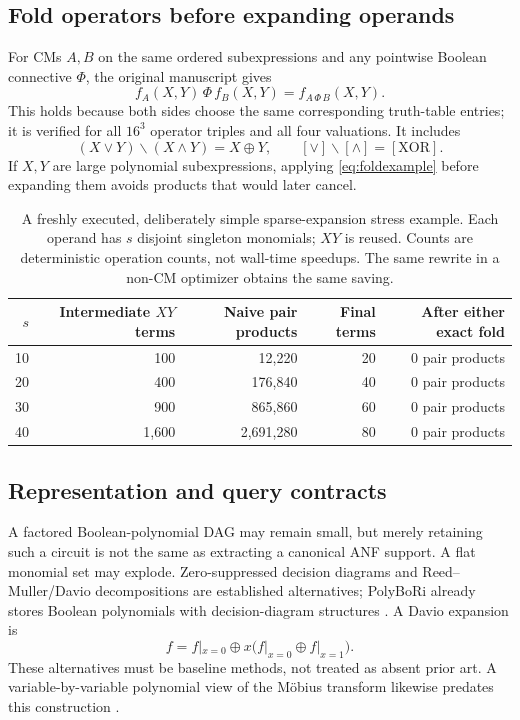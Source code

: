 \documentclass[11pt,a4paper]{article}
\theoremstyle{definition}\newtheorem{definition}[theorem]{Definition}
\theoremstyle{remark}\newtheorem{remark}[theorem]{Remark}
\numberwithin{equation}{section}
\begin{document}
\subsection{Fold operators before expanding operands}
For CMs $A,B$ on the same ordered subexpressions and any pointwise Boolean connective $\Phi$, the original manuscript gives
\begin{equation}\label{eq:fold}
 f_A(X,Y)\,\Phi\,f_B(X,Y)=f_{A\,\Phi\,B}(X,Y).
\end{equation}
This holds because both sides choose the same corresponding truth-table entries; it is verified for all $16^3$ operator triples and all four valuations. It includes
\begin{equation}\label{eq:foldexample}
 (X\lor Y)\backslash(X\land Y)=X\oplus Y,
 \qquad[\lor]\backslash[\land]=[\mathrm{XOR}].
\end{equation}
If $X,Y$ are large polynomial subexpressions, applying \cref{eq:foldexample} before expanding them avoids products that would later cancel.

\begin{table}[htbp]\centering\small
\begin{tabular}{@{}rrrrr@{}}\toprule
$s$ & Intermediate $XY$ terms & Naive pair products & Final terms & After either exact fold\\\midrule
10 & 100 & 12,220 & 20 & 0 pair products\\
20 & 400 & 176,840 & 40 & 0 pair products\\
30 & 900 & 865,860 & 60 & 0 pair products\\
40 & 1,600 & 2,691,280 & 80 & 0 pair products\\\bottomrule
\end{tabular}
\caption{A freshly executed, deliberately simple sparse-expansion stress example. Each operand has $s$ disjoint singleton monomials; $XY$ is reused. Counts are deterministic operation counts, not wall-time speedups. The same rewrite in a non-CM optimizer obtains the same saving.}
\label{tab:foldcost}
\end{table}

\subsection{Representation and query contracts}
A factored Boolean-polynomial DAG may remain small, but merely retaining such a circuit is not the same as extracting a canonical ANF support. A flat monomial set may explode. Zero-suppressed decision diagrams and Reed--Muller/Davio decompositions are established alternatives; PolyBoRi already stores Boolean polynomials with decision-diagram structures \cite{polybori,polyboridoc}. A Davio expansion is
\begin{equation}
 f=f|_{x=0}\oplus x\big(f|_{x=0}\oplus f|_{x=1}\big).
\end{equation}
These alternatives must be baseline methods, not treated as absent prior art. A variable-by-variable polynomial view of the M\"obius transform likewise predates this construction \cite{barbier}.
\end{document}
